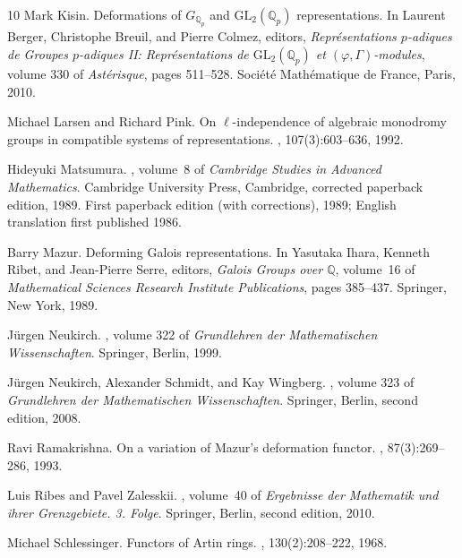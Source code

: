 \begin{thebibliography}{10}
Mark Kisin.
\newblock Deformations of {$G_{\mathbb Q_p}$} and {$\mathrm{GL}_2(\mathbb
  Q_p)$} representations.
\newblock In Laurent Berger, Christophe Breuil, and Pierre Colmez, editors,
  {\em Repr{\'e}sentations {$p$}-adiques de Groupes {$p$}-adiques II:
  Repr{\'e}sentations de {$\mathrm{GL}_2(\mathbb Q_p)$} et
  {$(\varphi,\Gamma)$}-modules}, volume 330 of {\em Ast{\'e}risque}, pages
  511--528. Soci{\'e}t{\'e} Math{\'e}matique de France, Paris, 2010.

Michael Larsen and Richard Pink.
\newblock On {$\ell$}-independence of algebraic monodromy groups in compatible
  systems of representations.
, 107(3):603--636, 1992.

Hideyuki Matsumura.
, volume~8 of {\em Cambridge Studies in
  Advanced Mathematics}.
\newblock Cambridge University Press, Cambridge, corrected paperback edition,
  1989.
\newblock First paperback edition (with corrections), 1989; English translation
  first published 1986.

Barry Mazur.
\newblock Deforming {Galois} representations.
\newblock In Yasutaka Ihara, Kenneth Ribet, and Jean-Pierre Serre, editors,
  {\em Galois Groups over {$\mathbb Q$}}, volume~16 of {\em Mathematical
  Sciences Research Institute Publications}, pages 385--437. Springer, New
  York, 1989.

J{\"u}rgen Neukirch.
, volume 322 of {\em Grundlehren der
  Mathematischen Wissenschaften}.
\newblock Springer, Berlin, 1999.

J{\"u}rgen Neukirch, Alexander Schmidt, and Kay Wingberg.
, volume 323 of {\em Grundlehren der
  Mathematischen Wissenschaften}.
\newblock Springer, Berlin, second edition, 2008.

Ravi Ramakrishna.
\newblock On a variation of {Mazur}'s deformation functor.
, 87(3):269--286, 1993.

Luis Ribes and Pavel Zalesskii.
, volume~40 of {\em Ergebnisse der Mathematik
  und ihrer Grenzgebiete. 3. Folge}.
\newblock Springer, Berlin, second edition, 2010.

Michael Schlessinger.
\newblock Functors of {Artin} rings.
,
  130(2):208--222, 1968.


\end{thebibliography}
